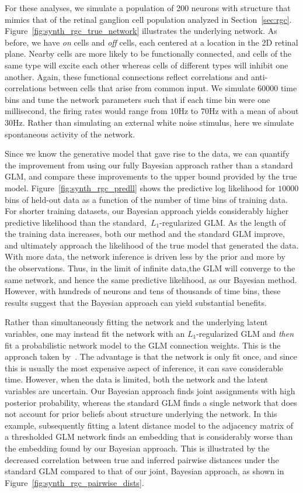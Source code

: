 For these analyses, we simulate a population of 200 neurons with
structure that mimics that of the retinal ganglion cell population
analyzed in
Section~\ref{sec:rgc}. Figure~\ref{fig:synth_rgc_true_network}
illustrates the underlying network. As before, we have \textit{on}
cells and \textit{off} cells, each centered at a location in the 2D
retinal plane. Nearby cells are more likely to be functionally
connected, and cells of the same type will excite each other whereas
cells of different types will inhibit one another. Again, these
functional connections reflect correlations and anti-correlations
between cells that arise from common input. We simulate $60000$ time
bins and tune the network parameters such that if each time bin were
one millisecond, the firing rates would range from $10$Hz to $70$Hz with a
mean of about $30$Hz.  Rather than simulating an external white noise
stimulus, here we simulate spontaneous activity of the network.

Since we know the generative model that gave rise to the data, we can
quantify the improvement from using our fully Bayesian approach
rather than a standard GLM, and compare these improvements to the
upper bound provided by the true model. Figure~\ref{fig:synth_rgc_predll}
shows the predictive log likelihood for $10000$ bins of held-out data as
a function of the number of time bins of training data. For shorter
training datasets, our Bayesian approach yields considerably higher
predictive likelihood than the standard,~$L_1$-regularized GLM. As
the length of the training data increases, both our method and
the standard GLM improve, and ultimately approach the likelihood of
the true model that generated the data. With more data, the network
inference is driven less by the prior and more by the observations.
Thus, in the limit of infinite data,the GLM will converge to the same
network, and hence the same predictive likelihood, as our Bayesian method.
However, with hundreds of neurons and tens of thousands of time bins,
these results suggest that the Bayesian approach can yield substantial
benefits.

Rather than simultaneously fitting the network and the underlying
latent variables, one may instead fit the network with an
$L_1$-regularized GLM and \textit{then} fit a probabilistic network
model to the GLM connection weights. This is the approach taken
by~\citet{stevenson2009bayesian}.  The advantage is that the network
is only fit once, and since this is usually the most expensive aspect
of inference, it can save considerable time. However, when the data is
limited, both the network and the latent variables are uncertain.  Our
Bayesian approach finds joint assignments with high posterior
probability, whereas the standard GLM finds a single network that does
not account for prior beliefs about structure underlying the network.
In this example, subsequently fitting a latent distance model to the
adjacency matrix of a thresholded GLM network finds an embedding that
is considerably worse than the embedding found by our Bayesian
approach. This is illustrated by the decreased correlation between
true and inferred pairwise distances under the standard GLM compared
to that of our joint, Bayesian approach, as shown in
Figure~\ref{fig:synth_rgc_pairwise_dists}.

